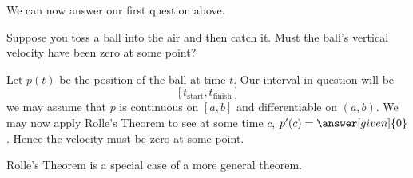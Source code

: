 \documentclass{ximera}
\begin{document}
We can now answer our first question above.

\begin{example}
Suppose you toss a ball into the air and then catch it. Must the
ball's vertical velocity have been zero at some point?
\begin{explanation}
  Let $p(t)$ be the position of the ball at time $t$. Our interval in question will be
  \[
  [t_\mathrm{start},t_\mathrm{finish}]
  \]
  we may assume that $p$ is continuous on $[a,b]$ and differentiable
  on $(a,b)$. We may now apply Rolle's Theorem to see at some time
  $c$, $p'(c)=\answer[given]{0}$. Hence the velocity must be zero at
  some point.
\end{explanation}
\end{example}

Rolle's Theorem is a special case of a more general theorem.
\end{document}
